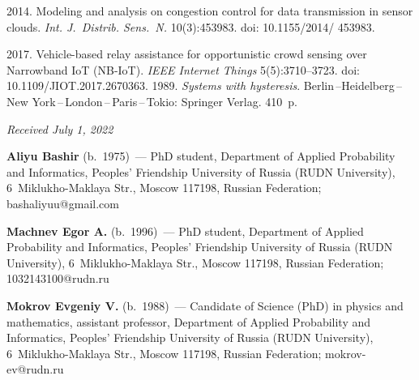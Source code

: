 \begin{multicols}{2}
{{\begin{thebibliography}{9}
 2014. Modeling 
and analysis on congestion control for data transmission in sensor clouds. \textit{Int. J.~Distrib. 
Sens.~N.} 10(3):453983. doi: 10.1155/2014/ 453983.

 2017. Vehicle-based relay assistance for opportunistic crowd sensing over 
Narrowband IoT (NB-IoT). \textit{IEEE Internet Things} 5(5):3710--3723. doi: 10.1109/JIOT.2017.2670363.
 1989. \textit{Systems with hysteresis}.  
Berlin\,--Heidelberg\,--New York\,--\,London\,--\,Paris\,--\,Tokio: Springer Verlag. 410~p.

\end{thebibliography}

 }
 }

\end{multicols}

\vspace*{-6pt}

\hfill{\small\textit{Received July 1, 2022}}

\Contr

\noindent
\textbf{Aliyu Bashir} (b.\ 1975)~--- PhD student, Department of Applied Probability and Informatics, 
Peoples' Friendship University of Russia (RUDN University), 6~Miklukho-Maklaya Str., Moscow 
117198, Russian Federation; \mbox{bashaliyuu@gmail.com}

\vspace*{4pt}

\noindent
\textbf{Machnev Egor A.} (b.\ 1996)~--- PhD student, Department of Applied Probability and 
Informatics, Peoples' Friendship University of Russia (RUDN University), 6~Miklukho-Maklaya Str., 
Moscow 117198, Russian Federation; \mbox{1032143100@rudn.ru}

\vspace*{4pt}

\noindent
\textbf{Mokrov Evgeniy V.} (b.\ 1988)~--- Candidate of Science (PhD) in physics and mathematics, 
assistant professor, Department of Applied Probability and Informatics, Peoples' Friendship University 
of Russia (RUDN University), 6~Miklukho-Maklaya Str., Moscow 117198, Russian Federation; 
\mbox{mokrov-ev@rudn.ru}
\label{end\stat}

\renewcommand{\bibname}{\protect\rm Литература}    